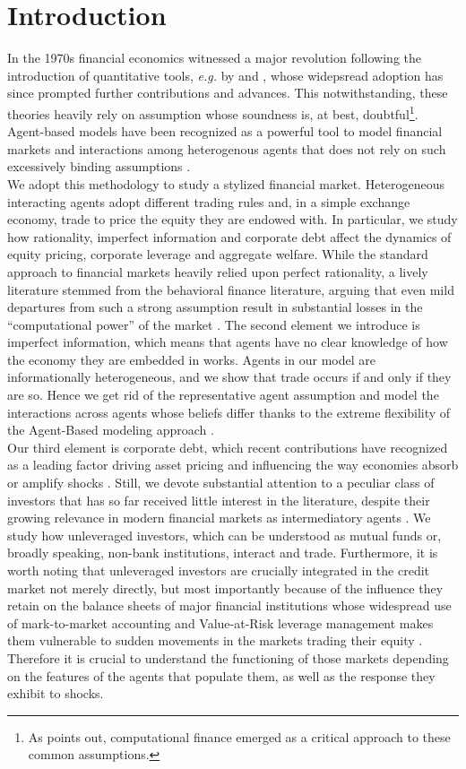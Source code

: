 \documentclass[11pt]{article}
\begin{document}
\section*{Introduction}\label{Introduction}
In the 1970s financial economics witnessed a major revolution following the introduction of quantitative tools, \emph{e.g.} by \cite{1} and \cite{2}, whose widepsread adoption has since prompted further contributions and advances. This notwithstanding, these theories heavily rely on assumption whose soundness is, at best, doubtful\footnote{As \cite{16} points out, computational finance emerged as a critical approach to these common assumptions.}. Agent-based models have been recognized as a powerful tool to model financial markets and interactions among heterogenous agents that does not rely on such excessively binding assumptions \citep{14,13}.\\
We adopt this methodology to study a stylized financial market. Heterogeneous interacting agents adopt different trading rules and, in a simple exchange economy, trade to price the equity they are endowed with. In particular, we study how rationality, imperfect information and corporate debt affect the dynamics of equity pricing, corporate leverage and aggregate welfare. While the standard approach to financial markets heavily relied upon perfect rationality, a lively literature stemmed from the behavioral finance literature, arguing that even mild departures from such a strong assumption result in substantial losses in the ``computational power'' of the market \citep{17}. The second element we introduce is imperfect information, which means that agents have no clear knowledge of how the economy they are embedded in works. Agents in our model are informationally heterogeneous, and we show that trade occurs if and only if they are so. Hence we get rid of the representative agent assumption and model the interactions across agents whose beliefs differ thanks to the extreme flexibility of the Agent-Based modeling approach \citep{12}.\\
Our third element is corporate debt, which recent contributions have recognized as a leading factor driving asset pricing and influencing the way economies absorb or amplify shocks \citep{10,11,3}. Still, we devote substantial attention to a peculiar class of investors that has so far received little interest in the literature, despite their growing relevance in modern financial markets as intermediatory agents \citep{8}. We study how unleveraged investors, which can be understood as mutual funds or, broadly speaking, non-bank institutions, interact and trade. Furthermore, it is worth noting that unleveraged investors are crucially integrated in the credit market not merely directly, but most importantly because of the influence they retain on the balance sheets of major financial institutions whose widespread use of mark-to-market accounting and Value-at-Risk leverage management makes them vulnerable to sudden movements in the markets trading their equity \citep{15,19}. Therefore it is crucial to understand the functioning of those markets depending on the features of the agents that populate them, as well as the response they exhibit to shocks.\\
\end{document}
